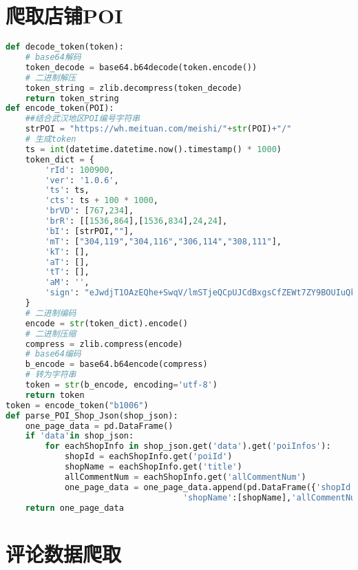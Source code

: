\documentclass[withoutpreface,bwprint]{cumcmthesis} %
\begin{document}
\newpage
\begin{appendices}


\section{爬取店铺POI}

\begin{lstlisting}[language=python]
def decode_token(token):
    # base64解码
    token_decode = base64.b64decode(token.encode())
    # 二进制解压
    token_string = zlib.decompress(token_decode)
    return token_string
def encode_token(POI):
    ##结合武汉地区POI编号字符串
    strPOI = "https://wh.meituan.com/meishi/"+str(POI)+"/"
    # 生成token
    ts = int(datetime.datetime.now().timestamp() * 1000)
    token_dict = {
        'rId': 100900,
        'ver': '1.0.6',
        'ts': ts,
        'cts': ts + 100 * 1000,
        'brVD': [767,234],
        'brR': [[1536,864],[1536,834],24,24],
        'bI': [strPOI,""],
        'mT': ["304,119","304,116","306,114","308,111"],
        'kT': [],
        'aT': [],
        'tT': [],
        'aM': '',
        'sign': "eJwdjT1OAzEQhe+SwqV/lmSTjeQCpUJCdBxgsCfZEWt7ZY9BOUIuQkfBpX"
    }
    # 二进制编码
    encode = str(token_dict).encode()
    # 二进制压缩
    compress = zlib.compress(encode)
    # base64编码
    b_encode = base64.b64encode(compress)
    # 转为字符串
    token = str(b_encode, encoding='utf-8')
    return token
token = encode_token("b1006")
def parse_POI_Shop_Json(shop_json):
    one_page_data = pd.DataFrame()
    if 'data'in shop_json:
        for eachShopInfo in shop_json.get('data').get('poiInfos'):
            shopId = eachShopInfo.get('poiId')
            shopName = eachShopInfo.get('title')
            allCommentNum = eachShopInfo.get('allCommentNum')
            one_page_data = one_page_data.append(pd.DataFrame({'shopId':[shopId],
                                    'shopName':[shopName],'allCommentNum':[allCommentNum]}))
    return one_page_data
 \end{lstlisting}

 \section{评论数据爬取}


\end{appendices}
\end{document}
